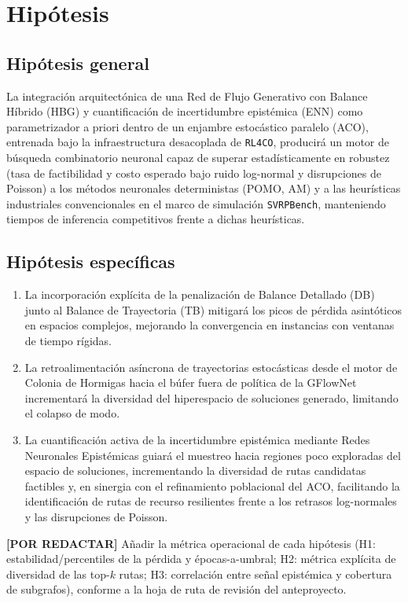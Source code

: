 \documentclass[12pt]{report}
\newcommand{\pendiente}[1]{\par\noindent\colorbox{lightbg}{%
  \begin{minipage}{0.94\linewidth}\small
  \textcolor{uanlgold}{\textbf{[POR REDACTAR]}} #1
  \end{minipage}}\par\medskip}
\begin{document}
\section{Hip\'otesis}\label{sec:hipotesis}

\subsection*{Hip\'otesis general}
La integraci\'on arquitect\'onica de una Red de Flujo Generativo con Balance
H\'ibrido (HBG) y cuantificaci\'on de incertidumbre epist\'emica (ENN) como
parametrizador a priori dentro de un enjambre estoc\'astico paralelo (ACO),
entrenada bajo la infraestructura desacoplada de \texttt{RL4CO}, producir\'a un
motor de b\'usqueda combinatorio neuronal capaz de superar estad\'isticamente en
robustez (tasa de factibilidad y costo esperado bajo ruido log-normal y
disrupciones de Poisson) a los m\'etodos neuronales deterministas (POMO, AM) y a
las heur\'isticas industriales convencionales en el marco de simulaci\'on
\texttt{SVRPBench}, manteniendo tiempos de inferencia competitivos frente a
dichas heur\'isticas.

\subsection*{Hip\'otesis espec\'ificas}
\begin{enumerate}[label=\textbf{H\arabic*.},leftmargin=1.5cm,itemsep=0.5em]
  \item La incorporaci\'on expl\'icita de la penalizaci\'on de Balance Detallado
  (DB) junto al Balance de Trayectoria (TB) mitigar\'a los picos de p\'erdida
  asint\'oticos en espacios complejos, mejorando la convergencia en instancias
  con ventanas de tiempo r\'igidas.
  \item La retroalimentaci\'on as\'incrona de trayectorias estoc\'asticas desde
  el motor de Colonia de Hormigas hacia el b\'ufer fuera de pol\'itica de la
  GFlowNet incrementar\'a la diversidad del hiperespacio de soluciones generado,
  limitando el colapso de modo.
  \item La cuantificaci\'on activa de la incertidumbre epist\'emica mediante
  Redes Neuronales Epist\'emicas guiar\'a el muestreo hacia regiones poco
  exploradas del espacio de soluciones, incrementando la diversidad de rutas
  candidatas factibles y, en sinergia con el refinamiento poblacional del ACO,
  facilitando la identificaci\'on de rutas de recurso resilientes frente a los
  retrasos log-normales y las disrupciones de Poisson.
\end{enumerate}
\pendiente{A\~nadir la m\'etrica operacional de cada hip\'otesis (H1:
estabilidad/percentiles de la p\'erdida y \'epocas-a-umbral; H2: m\'etrica
expl\'icita de diversidad de las top-$k$ rutas; H3: correlaci\'on entre se\~nal
epist\'emica y cobertura de subgrafos), conforme a la hoja de ruta de
revisi\'on del anteproyecto.}
\end{document}
